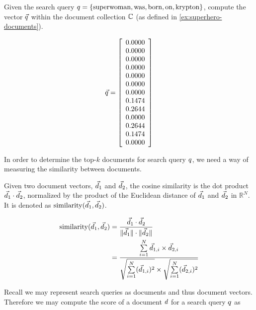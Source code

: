 		\begin{ex}
			Given the search query \(q = \{\text{superwoman}, \text{was}, \text{born}, \text{on}, \text{krypton}\}\), compute the vector \(\vec{q}\) within the document collection \(\mathbb{C}\) (as defined in \vref{ex:superhero-documents}).
			
			\[
				\vec{q} = 
					\left[
						\begin{array}{c}
							0.0000 \\
							0.0000 \\
							0.0000 \\
							0.0000 \\
							0.0000 \\
							0.0000 \\
							0.0000 \\
							0.1474 \\
							0.2644 \\
							0.0000 \\
							0.2644 \\
							0.1474 \\
							0.0000 \\
						\end{array}
					\right]
			\]
		\end{ex}
		
		In order to determine the top-\(k\) documents for search query \(q\), we need a way of measuring the similarity between documents.
		
		\begin{defn}
			Given two document vectors, \(\vec{d}_1\) and \(\vec{d}_2\), the cosine similarity is the dot product \(\vec{d}_1 \cdot \vec{d}_2\), normalized by the product of the Euclidean distance of \(\vec{d}_1\) and \(\vec{d}_2\) in \(\mathbb{R}^N\).	It is denoted as \(\operatorname{similarity}(\vec{d}_1, \vec{d}_2)\).
			
			\begin{align}
				\operatorname{similarity}(\vec{d}_1, \vec{d}_2) &= \frac{\vec{d}_1 \cdot \vec{d}_2}{\lVert\vec{d}_1\rVert \cdot \lVert\vec{d}_2\rVert} \\
				 &= \frac{\sum\limits_{i=1}^{N} \vec{d}_{1, i} \times \vec{d}_{2, i}}{\sqrt{\sum\limits_{i=1}^{N} (\vec{d}_{1, i})^2} \times \sqrt{\sum\limits_{i=1}^{N} (\vec{d}_{2, i})^2}}
			\end{align}
		\end{defn}
		
		Recall we may represent search queries as documents and thus document vectors.	Therefore we may compute the score of a document \(d\) for a search query \(q\) as
		
